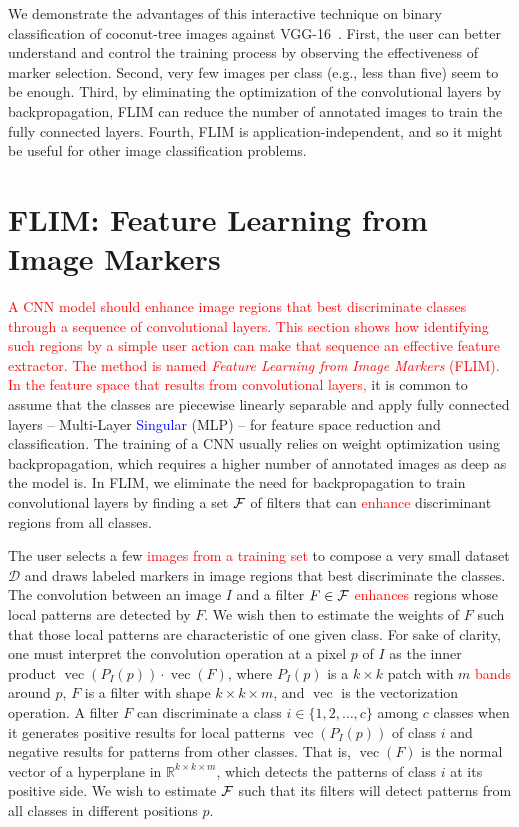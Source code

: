 \documentclass[journal, twoside]{IEEEtran}
\DeclareMathOperator{\vect}{vec}
\newcommand{\R}{\mathbb{R}}
\newcommand{\D}{\mathcal{D}}
\begin{document}
We demonstrate the advantages of this interactive technique on binary classification of coconut-tree images against  VGG-16~\cite{simonyan2014very}. First, the user can better understand and control the training process by observing the effectiveness of marker selection.  Second, very few images per class (e.g., less than five) seem to be enough. Third, by eliminating the optimization of the convolutional layers by backpropagation, FLIM can reduce the number of annotated images to train the fully connected layers. Fourth, FLIM is application-independent, and so it might be useful for other image classification problems.

\section{FLIM: Feature Learning from Image Markers}
\label{sec:method}
  
\textcolor{red}{A CNN model should enhance image regions that best discriminate classes through a sequence of convolutional layers. This section shows how identifying such regions by a simple user action can make that sequence an effective feature extractor. The method is named \emph{Feature Learning from Image Markers} (FLIM). In the feature space that results from convolutional layers,} it is common to assume that the classes are piecewise linearly separable and apply fully connected layers -- Multi-Layer \textcolor{blue}{Singular} (MLP) -- for feature space reduction and classification. The training of a CNN usually relies on weight optimization using backpropagation, which requires a higher number of annotated images as deep as the model is. In FLIM, we eliminate the need for backpropagation to train convolutional layers by finding a set ${\cal F}$ of filters that can \textcolor{red}{enhance} discriminant regions from all classes.

The user selects a few \textcolor{red}{images from a training set} to compose a very small dataset $\D$ and draws labeled markers in image regions that best discriminate the classes. The convolution between an image $I$ and a filter $F\in {\cal F}$ \textcolor{red}{ enhances} regions whose local patterns are detected by $F$. We wish then to estimate the weights of $F$ such that those local patterns are characteristic of one given class. For sake of clarity, one must interpret the convolution operation at a pixel $p$ of $I$ as the inner product $\vect(P_I(p)) \cdot \vect(F)$, where $P_I(p)$ is a $k\times k$ patch with $m$ \textcolor{red}{bands} around $p$, $F$ is a filter with shape $k\times k \times m$, and $\vect$ is the vectorization operation. A filter $F$ can discriminate a class $i \in \{1,2,\ldots,c\}$ among $c$ classes when it generates positive results for local patterns $\vect(P_I(p))$ of class $i$ and negative results for patterns from other classes. That is, $\vect(F)$ is the normal vector of a hyperplane in $\R^{k\times k\times m}$, which detects the patterns of class $i$ at its positive side. We wish to estimate ${\cal F}$ such that its filters will detect patterns from all classes in different positions $p$. 
\end{document}

